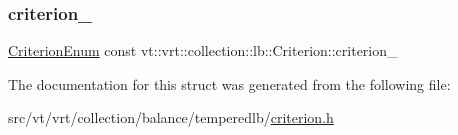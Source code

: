 \subsubsection{\texorpdfstring{criterion\+\_\+}{criterion\_}}
{\footnotesize\ttfamily \hyperlink{namespacevt_1_1vrt_1_1collection_1_1lb_a4e454750e102cf5404d5ac151148951c}{Criterion\+Enum} const vt\+::vrt\+::collection\+::lb\+::\+Criterion\+::criterion\+\_\+\hspace{0.3cm}{\ttfamily [protected]}}



The documentation for this struct was generated from the following file\+:\begin{DoxyCompactItemize}
\item 
src/vt/vrt/collection/balance/temperedlb/\hyperlink{criterion_8h}{criterion.\+h}\end{DoxyCompactItemize}
